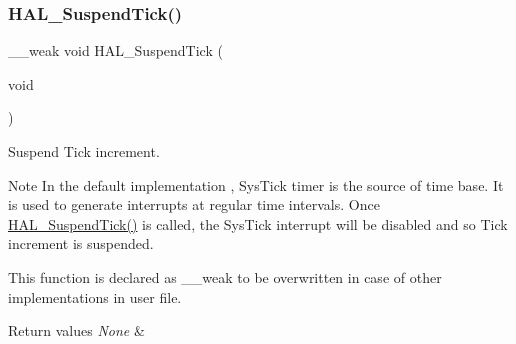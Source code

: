 \subsubsection{\texorpdfstring{HAL\_SuspendTick()}{HAL\_SuspendTick()}}
{\footnotesize\ttfamily \+\_\+\+\_\+weak void H\+A\+L\+\_\+\+Suspend\+Tick (\begin{DoxyParamCaption}\item[{void}]{ }\end{DoxyParamCaption})}



Suspend Tick increment. 

\begin{DoxyNote}{Note}
In the default implementation , Sys\+Tick timer is the source of time base. It is used to generate interrupts at regular time intervals. Once \mbox{\hyperlink{group___h_a_l___exported___functions___group2_ga84ae4b045c45d49d96b2b02e2dc516b6}{H\+A\+L\+\_\+\+Suspend\+Tick()}} is called, the Sys\+Tick interrupt will be disabled and so Tick increment is suspended. 

This function is declared as \+\_\+\+\_\+weak to be overwritten in case of other implementations in user file. 
\end{DoxyNote}

\begin{DoxyRetVals}{Return values}
{\em None} & \\
\hline
\end{DoxyRetVals}

